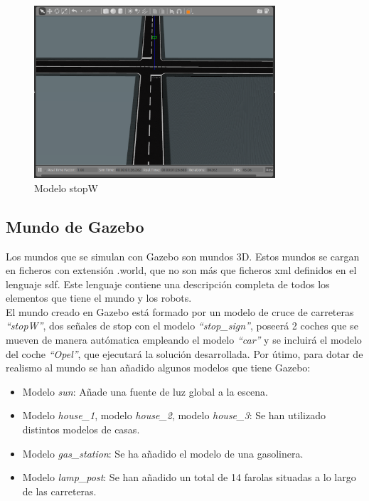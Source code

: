 \begin{figure}[H]
  \begin{center}
    \includegraphics[width=0.8\textwidth]{figures/Stop/stopW.png}
		\caption{Modelo stopW}
		\label{fig.stopW}
		\end{center}
\end{figure}

\subsection{Mundo de Gazebo}
Los mundos que se simulan con Gazebo son mundos 3D. Estos mundos se cargan en ficheros con extensión .world, que no son más que ficheros \acrshort{xml} definidos en el lenguaje \acrshort{sdf}. Este lenguaje contiene una descripción completa de todos los elementos que tiene el mundo y los robots.\\

El mundo creado en Gazebo está formado por un modelo de cruce de carreteras \textit{``stopW''}, dos señales de stop con el modelo \textit{``stop\_sign''}, poseerá 2 coches que se mueven de manera autómatica empleando el modelo \textit{``car''} y se incluirá el modelo del coche \textit{``Opel''}, que ejecutará la solución desarrollada. Por útimo, para dotar de realismo al mundo se han añadido algunos modelos que tiene Gazebo:

\begin{itemize}
\item	Modelo \textit{sun}: Añade una fuente de luz global a la escena.
\item	Modelo \textit{house\_1}, modelo \textit{house\_2}, modelo \textit{house\_3}: Se han utilizado distintos modelos de casas.
\item	Modelo \textit{gas\_station}: Se ha añadido el modelo de una gasolinera.
\item	Modelo \textit{lamp\_post}: Se han añadido un total de 14 farolas situadas a lo largo de las carreteras.
\end{itemize}

